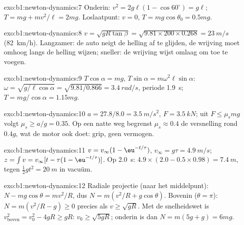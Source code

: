 \begin{solution}{exo:b1:newton-dynamics:7}
Onderin: $v^2 = 2g\ell(1 - \cos 60^\circ) = g\ell$; $T = mg + mv^2/\ell =
2mg$. Loslaatpunt: $v = 0$, $T = mg\cos\theta_0 = 0.5mg$.
\end{solution}

\begin{solution}{exo:b1:newton-dynamics:8}
$v = \sqrt{gR\tan\beta} = \sqrt{9.81 \times 200 \times 0.268} = \qty{23}{m/s}$
(\qty{82}{km/h}). Langzamer: de auto neigt de helling af te glijden, de wrijving
moet omhoog langs de helling wijzen; sneller: de wrijving wijst omlaag om
 toe te voegen.
\end{solution}

\begin{solution}{exo:b1:newton-dynamics:9}
$T\cos\alpha = mg$, $T\sin\alpha = m\omega^2\ell\sin\alpha$: $\omega =
\sqrt{g/\ell\cos\alpha} = \sqrt{9.81/0.866} = \qty{3.4}{rad/s}$, periode
\qty{1.9}{s}; $T = mg/\cos\alpha = 1.15mg$.
\end{solution}

\begin{solution}{exo:b1:newton-dynamics:10}
$a = 27.8/8.0 = \qty{3.5}{m/s^2}$, $F = \qty{3.5}{kN}$; uit $F \leq \mu_smg$
volgt $\mu_s \geq a/g = 0.35$. Op een natte weg begrenst $\mu_s \approx 0.4$ de
versnelling rond $0.4g$, wat de motor ook doet: grip, geen vermogen.
\end{solution}

\begin{solution}{exo:b1:newton-dynamics:11}
$v = v_\infty(1 - \eu^{-t/\tau})$, $v_\infty = g\tau = \qty{4.9}{m/s}$;
$z = \int v = v_\infty[t - \tau(1 - \eu^{-t/\tau})]$. Op \qty{2.0}{s}:
$4.9 \times (2.0 - 0.5 \times 0.98) = \qty{7.4}{m}$, tegen $\tfrac12 gt^2
= \qty{20}{m}$ in vacuüm.
\end{solution}

\begin{solution}{exo:b1:newton-dynamics:12}
Radiale projectie (naar het middelpunt): $N - mg\cos\theta = mv^2/R$, dus
$N = m(v^2/R + g\cos\theta)$. Bovenin ($\theta = \pi$): $N = m(v^2/R - g)
\geq 0$ precies als $v \geq \sqrt{gR}$. Met de snelheidswet is $v_{\text{boven}}^2 =
v_0^2 - 4gR \geq gR$: $v_0 \geq \sqrt{5gR}$; onderin is dan $N =
m(5g + g) = 6mg$.
\end{solution}


